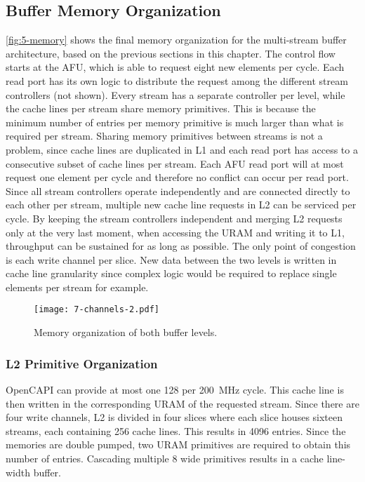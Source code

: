\subsection{Buffer Memory Organization}
\autoref{fig:5-memory} shows the final memory organization for the multi-stream buffer architecture, based on the previous sections in this chapter. The control flow starts at the AFU, which is able to request eight new elements per cycle. Each read port has its own logic to distribute the request among the different stream controllers (not shown). Every stream has a separate controller per level, while the cache lines per stream share memory primitives. This is because the minimum number of entries per memory primitive is much larger than what is required per stream. Sharing memory primitives between streams is not a problem, since cache lines are duplicated in L1 and each read port has access to a consecutive subset of cache lines per stream. Each AFU read port will at most request one element per cycle and therefore no conflict can occur per read port. Since all stream controllers operate independently and are connected directly to each other per stream, multiple new cache line requests in L2 can be serviced per cycle. By keeping the stream controllers independent and merging L2 requests only at the very last moment, when accessing the URAM and writing it to L1, throughput can be sustained for as long as possible. The only point of congestion is each write channel per slice. New data between the two levels is written in cache line granularity since complex logic would be required to replace single elements per stream for example.

\begin{figure}[H]
  \centering
  \texttt{[image: 7-channels-2.pdf]}
  \caption{Memory organization of both buffer levels.}
  \label{fig:5-memory}
\end{figure}

\subsubsection{L2 Primitive Organization}
OpenCAPI can provide at most one \SI{128}{\byte} per \SI{200}{\mega\hertz} cycle. This cache line is then written in the corresponding URAM of the requested stream. Since there are four write channels, L2 is divided in four slices where each slice houses sixteen streams, each containing 256 cache lines. This results in 4096 entries. Since the memories are double pumped, two URAM primitives are required to obtain this number of entries. Cascading multiple \SI{8}{\byte} wide primitives results in a cache line-width buffer.

